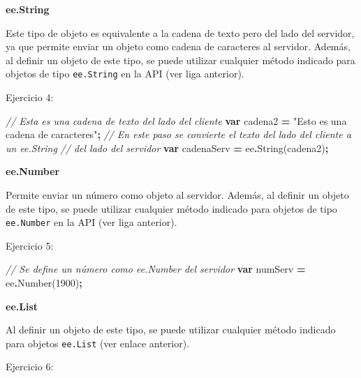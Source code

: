 \documentclass[
  12pt,
  letterpaper,
  twoside]{book}
\newenvironment{Shaded}{\begin{snugshade}}{\end{snugshade}}
\newcommand{\CommentTok}[1]{\textcolor[rgb]{0.56,0.35,0.01}{\textit{#1}}}
\newcommand{\DecValTok}[1]{\textcolor[rgb]{0.00,0.00,0.81}{#1}}
\newcommand{\FunctionTok}[1]{\textcolor[rgb]{0.00,0.00,0.00}{#1}}
\newcommand{\KeywordTok}[1]{\textcolor[rgb]{0.13,0.29,0.53}{\textbf{#1}}}
\newcommand{\NormalTok}[1]{#1}
\newcommand{\OperatorTok}[1]{\textcolor[rgb]{0.81,0.36,0.00}{\textbf{#1}}}
\newcommand{\StringTok}[1]{\textcolor[rgb]{0.31,0.60,0.02}{#1}}
\begin{document}
\textbf{ee.String}

Este tipo de objeto es equivalente a la cadena de texto pero del lado del servidor, ya que permite enviar un objeto como cadena de caracteres al servidor. Además, al definir un objeto de este tipo, se puede utilizar cualquier método indicado para objetos de tipo \texttt{ee.String} en la API (ver liga anterior).

Ejercicio 4:

\begin{Shaded}
\begin{Highlighting}[]
\CommentTok{// Esta es una cadena de texto del lado del cliente}
\KeywordTok{var}\NormalTok{ cadena2 }\OperatorTok{=} \StringTok{"Esto es una cadena de caracteres"}\OperatorTok{;}
\CommentTok{// En este paso se convierte el texto del lado del cliente a un ee.String}
\CommentTok{// del lado del servidor}
\KeywordTok{var}\NormalTok{ cadenaServ }\OperatorTok{=}\NormalTok{ ee}\OperatorTok{.}\FunctionTok{String}\NormalTok{(cadena2)}\OperatorTok{;}                         
\end{Highlighting}
\end{Shaded}

\textbf{ee.Number}

Permite enviar un número como objeto al servidor. Además, al definir un objeto de este tipo, se puede utilizar cualquier método indicado para objetos de tipo \texttt{ee.Number} en la API (ver liga anterior).

Ejercicio 5:

\begin{Shaded}
\begin{Highlighting}[]
\CommentTok{// Se define un número como \textasciigrave{}ee.Number\textasciigrave{} del servidor}
\KeywordTok{var}\NormalTok{ numServ }\OperatorTok{=}\NormalTok{ ee}\OperatorTok{.}\FunctionTok{Number}\NormalTok{(}\DecValTok{1900}\NormalTok{)}\OperatorTok{;}                              
\end{Highlighting}
\end{Shaded}

\textbf{ee.List}

Al definir un objeto de este tipo, se puede utilizar cualquier método indicado para objetos \texttt{ee.List} (ver enlace anterior).

Ejercicio 6:
\end{document}
